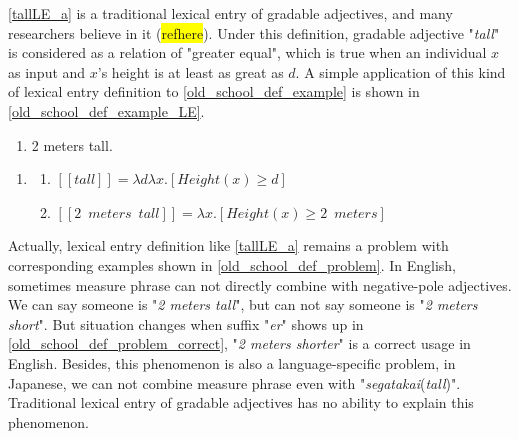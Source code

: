 \documentclass{ctexart}
\begin{document}
\ref{tallLE_a} is a traditional lexical entry of gradable adjectives, and many researchers believe in it (\colorbox{yellow}{refhere}). Under this definition, gradable adjective "\textit{tall}" is considered as a relation of "greater equal", which is true when an individual $x$ as input and $x$'s height is at least as great as $d$. A simple application of this kind of lexical entry definition to \ref{old_school_def_example} is shown in \ref{old_school_def_example_LE}.

\begin{enumerate}[resume]

    \item \label{old_school_def_example} 2 meters tall.

\end{enumerate}

\begin{enumerate}[resume]

    \item \label{old_school_def_example_LE}
    
    \begin{enumerate}[ref=(\arabic{enumi}\alph*)]
        
        \item $[\![tall]\!]=\lambda d \lambda x.[Height(x) \geq d]$
        \item $[\![2 \enspace meters \enspace tall]\!]=\lambda x.[Height(x) \geq 2 \enspace meters]$

    \end{enumerate}

\end{enumerate}

Actually, lexical entry definition like \ref{tallLE_a} remains a problem with corresponding examples shown in \ref{old_school_def_problem}. In English, sometimes measure phrase can not directly combine with negative-pole adjectives. We can say someone is "\textit{2 meters tall}", but can not say someone is "\textit{2 meters short}". But situation changes when suffix "\textit{er}" shows up in \ref{old_school_def_problem_correct}, "\textit{2 meters shorter}" is a correct usage in English. Besides, this phenomenon is also a language-specific problem, in Japanese, we can not combine measure phrase even with "\textit{segatakai}(\textit{tall})". Traditional lexical entry of gradable adjectives has no ability to explain this phenomenon.
\end{document}
